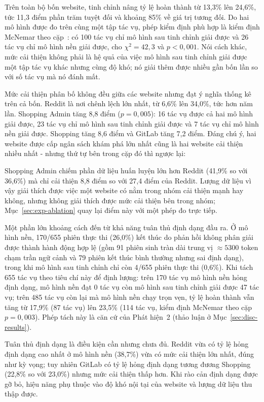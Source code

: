 Trên toàn bộ bốn website, tinh chỉnh nâng tỷ lệ hoàn thành từ 13{,}3\% lên 24{,}6\%, tức 11{,}3 điểm phần trăm tuyệt đối và khoảng 85\% về giá trị tương đối. Do hai mô hình được đo trên cùng một tập tác vụ, phép kiểm định phù hợp là kiểm định McNemar theo cặp~\cite{mcnemar1947}: có 100 tác vụ chỉ mô hình sau tinh chỉnh giải được và 26 tác vụ chỉ mô hình nền giải được, cho $\chi^2 = 42{,}3$ và $p < 0{,}001$. Nói cách khác, mức cải thiện không phải là hệ quả của việc mô hình sau tinh chỉnh giải được một tập tác vụ khác nhưng cùng độ khó; nó giải thêm được nhiều gần bốn lần so với số tác vụ mà nó đánh mất.

Mức cải thiện phân bố không đều giữa các website nhưng đạt ý nghĩa thống kê trên cả bốn. Reddit là nơi chênh lệch lớn nhất, từ 6{,}6\% lên 34{,}0\%, tức hơn năm lần. Shopping Admin tăng 8{,}8 điểm ($p = 0{,}005$): 16 tác vụ được cả hai mô hình giải được, 23 tác vụ chỉ mô hình sau tinh chỉnh giải được và 7 tác vụ chỉ mô hình nền giải được. Shopping tăng 8{,}6 điểm và GitLab tăng 7{,}2 điểm. Đáng chú ý, hai website được cấp ngân sách khám phá lớn nhất cũng là hai website cải thiện nhiều nhất - nhưng thứ tự bên trong cặp đó thì ngược lại:

Shopping Admin chiếm phần dữ liệu huấn luyện lớn hơn Reddit (41{,}9\% so với 36{,}6\%) mà chỉ cải thiện 8{,}8 điểm so với 27{,}4 điểm của Reddit. Lượng dữ liệu vì vậy giải thích được việc một website có nằm trong nhóm cải thiện mạnh hay không, nhưng không giải thích được mức cải thiện bên trong nhóm; Mục~\ref{sec:exp-ablation} quay lại điểm này với một phép đo trực tiếp.

Một phần lớn khoảng cách đến từ khả năng tuân thủ định dạng đầu ra. Ở mô hình nền, 170/655 phiên thực thi (26{,}0\%) kết thúc do phản hồi không phân giải được thành hành động hợp lệ (gồm 91 phiên sinh tràn dài trung vị $\approx 5300$ token chạm trần ngữ cảnh và 79 phiên kết thúc bình thường nhưng sai định dạng), trong khi mô hình sau tinh chỉnh chỉ còn 4/655 phiên thực thi (0{,}6\%). Khi tách 655 tác vụ theo tiêu chí này để định lượng: trên 170 tác vụ mô hình nền hỏng định dạng, mô hình nền đạt 0 tác vụ còn mô hình sau tinh chỉnh giải được 47 tác vụ; trên 485 tác vụ còn lại mà mô hình nền chạy trọn vẹn, tỷ lệ hoàn thành vẫn tăng từ 17{,}9\% (87 tác vụ) lên 23{,}5\% (114 tác vụ, kiểm định McNemar theo cặp $p = 0{,}003$). Phép tách này là căn cứ của Phát hiện~2 (thảo luận ở Mục~\ref{sec:disc-results}).

Tuân thủ định dạng là điều kiện cần nhưng chưa đủ. Reddit vừa có tỷ lệ hỏng định dạng cao nhất ở mô hình nền (38{,}7\%) vừa có mức cải thiện lớn nhất, đúng như kỳ vọng; tuy nhiên GitLab có tỷ lệ hỏng định dạng tương đương Shopping (22{,}8\% so với 23{,}0\%) nhưng mức cải thiện thấp hơn. Khi rào cản định dạng được gỡ bỏ, hiệu năng phụ thuộc vào độ khó nội tại của website và lượng dữ liệu thu thập được.

